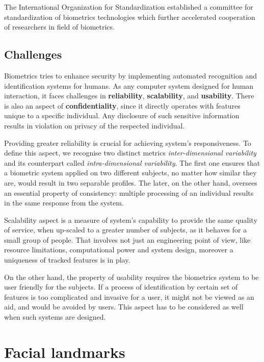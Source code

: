 The International Organization for Standardization established a committee for standardization of biometrics technologies which further accelerated cooperation of researchers in field of biometrics.

\subsection{Challenges}

Biometrics tries to enhance security by implementing automated recognition and identification systems for humans. As any computer system designed for human interaction, it faces challenges in \textbf{reliability}, \textbf{scalability}, and \textbf{usability}. There is also an aspect of \textbf{confidentiality}, since it directly operates with features unique to a specific individual. Any disclosure of such sensitive information results in violation on privacy of the respected individual.

Providing greater reliability is crucial for achieving system's responsiveness. To define this aspect, we recognise two distinct metrics \textit{inter-dimensional variability} and its counterpart called \textit{intra-dimensional variability}. The first one ensures that a biometric system applied on two different subjects, no matter how similar they are, would result in two separable profiles. The later, on the other hand, oversees an essential property of consistency: multiple processing of an individual results in the same response from the system.

Scalability aspect is a measure of system's capability to provide the same quality of service, when up-scaled to a greater number of subjects, as it behaves for a small group of people. That involves not just an engineering point of view, like resource limitations, computational power and system design, moreover a uniqueness of tracked features is in play.

On the other hand, the property of usability requires the biometrics system to be user friendly for the subjects. If a process of identification by certain set of features is too complicated and invasive for a user, it might not be viewed as an aid, and would be avoided by users. This aspect has to be considered as well when such systems are designed.

\section{Facial landmarks}

